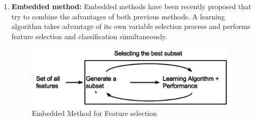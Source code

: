 \documentclass[document.tex]{subfiles}
\begin{document}
\begin{enumerate}
	\item \textbf{Embedded method:} Embedded methods have been recently proposed that try to combine the advantages of both previous methods. A learning algorithm takes advantage of its own variable selection process and performs feature selection and classification simultaneously.
	\begin{figure}[H]
		\begin{center}
			\includegraphics[height=3.0cm]{imgs/embeddedMethod.png}
		\end{center}
		\caption{Embedded Method for Feature selection}
		\label{fig:Embedded Method for Feature selection}
	\end{figure}
\end{enumerate}
\end{document}
